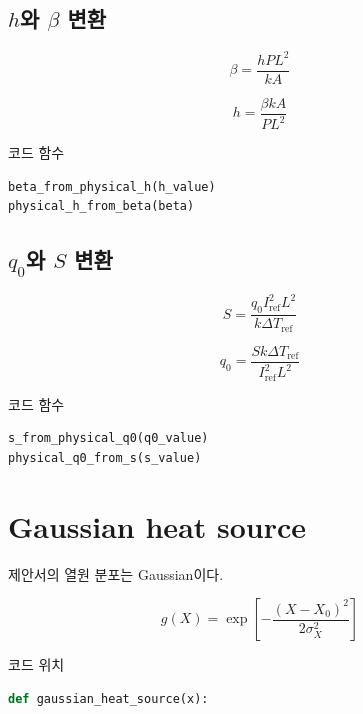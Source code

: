 \documentclass[11pt]{article}
\begin{document}
\subsection{\texorpdfstring{\(h\)와 \(\beta\) 변환}{h and beta conversion}}

\begin{equation}
\beta = \frac{hPL^2}{kA}
\end{equation}

\begin{equation}
h = \frac{\beta kA}{PL^2}
\end{equation}

코드 함수

\begin{lstlisting}[language=Python]
beta_from_physical_h(h_value)
physical_h_from_beta(beta)
\end{lstlisting}

\subsection{\texorpdfstring{\(q_0\)와 \(S\) 변환}{q0 and S conversion}}

\begin{equation}
S =
\frac{q_0 I_{\mathrm{ref}}^2 L^2}
{k\Delta T_{\mathrm{ref}}}
\end{equation}

\begin{equation}
q_0 =
\frac{S k \Delta T_{\mathrm{ref}}}
{I_{\mathrm{ref}}^2 L^2}
\end{equation}

코드 함수

\begin{lstlisting}[language=Python]
s_from_physical_q0(q0_value)
physical_q0_from_s(s_value)
\end{lstlisting}

\section{Gaussian heat source}

제안서의 열원 분포는 Gaussian이다.

\begin{equation}
g(X)
=
\exp\left[
-
\frac{(X-X_0)^2}{2\sigma_X^2}
\right]
\end{equation}

코드 위치

\begin{lstlisting}[language=Python]
def gaussian_heat_source(x):
\end{lstlisting}
\end{document}
